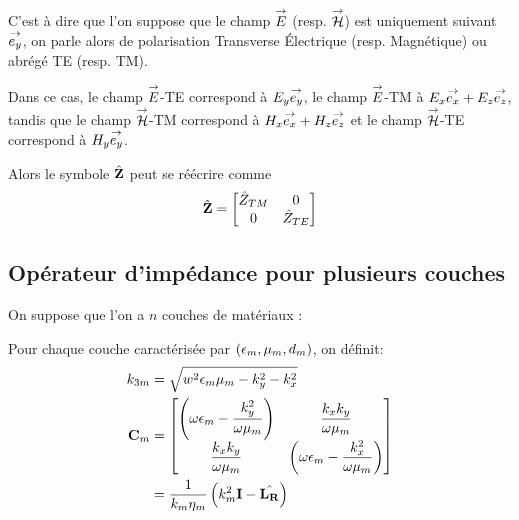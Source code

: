         C'est à dire que l'on suppose que le champ \(\vE\) (resp. \(\vH\)) est uniquement suivant \(\vect{e_y}\), on parle alors de polarisation Transverse Électrique (resp. Magnétique) ou abrégé TE (resp. TM).

        Dans ce cas, le champ \(\vE\)-TE correspond à \({E_y} \vect{e_y}\), le champ \(\vE\)-TM à \({E_x} \vect{e_x} + {E_z} \vect{e_z} \), tandis que le champ \(\vH\)-TM correspond à \({H_x} \vect{e_x} + {H_z} \vect{e_z}\) et le champ \(\vH\)-TE correspond à \({H_y} \vect{e_y}\).
        
        Alors le symbole \(\hat \mZ\) peut se réécrire comme
        \begin{equation}
            \hat \mZ =
            \begin{bmatrix}
                \hat Z_{TM} & 0
                \\
                0 & \hat Z_{TE}
            \end{bmatrix}
        \end{equation}


    \subsection{Opérateur d'impédance pour plusieurs couches}
        On suppose que l'on a \(n\) couches de matériaux :

        \begin{figure}[h!btp]
            \centering
            \begin{tikzpicture}
                
            \end{tikzpicture}
        \end{figure}

        Pour chaque couche caractérisée par \((\eps_m,\mu_m,d_m)\), on définit:
        \begin{align}
        k_{3m} &= \sqrt{w^2\eps_m\mu_m - k_y^2 - k_x^2}
        \\
        \mC_m &=
            \begin{bmatrix}
                \left(\w\eps_m-\frac{k_y^2}{\w\mu_m}\right) & \frac{k_xk_y}{\w\mu_m}\\
                \frac{k_xk_y}{\w\mu_m} & \left(\w\eps_m-\frac{k_x^2}{\w\mu_m}\right)
            \end{bmatrix}
            \\
            &= \frac{1}{k_m\eta_m}\left(k_m^2 \mI - \hat{\mLR}\right)
        \end{align}

